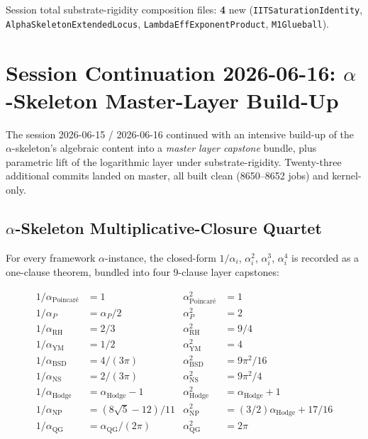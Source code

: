 Session total substrate-rigidity composition files: \textbf{4} new
(\texttt{IITSaturationIdentity}, \texttt{AlphaSkeletonExtendedLocus},
\texttt{LambdaEffExponentProduct}, \texttt{M1Glueball}).

\section{Session Continuation 2026-06-16:
  \texorpdfstring{$\alpha$}{alpha}-Skeleton Master-Layer Build-Up}
\label{sec:session-continuation-2026-06-16}

The session 2026-06-15 / 2026-06-16 continued with an intensive
build-up of the $\alpha$-skeleton's algebraic content into a
\emph{master layer capstone} bundle, plus parametric lift of the
logarithmic layer under substrate-rigidity. Twenty-three additional
commits landed on master, all built clean (8650--8652 jobs) and
kernel-only.

\subsection{\texorpdfstring{$\alpha$}{alpha}-Skeleton Multiplicative-Closure Quartet}

For every framework $\alpha$-instance, the closed-form $1/\alpha_i$,
$\alpha_i^2$, $\alpha_i^3$, $\alpha_i^4$ is recorded as a one-clause
theorem, bundled into four 9-clause layer capstones:

\begin{align*}
1/\alpha_{\text{Poincar\'e}} &= 1
& \alpha_{\text{Poincar\'e}}^2 &= 1 \\
1/\alpha_P &= \alpha_P / 2
& \alpha_P^2 &= 2 \\
1/\alpha_{\text{RH}} &= 2/3
& \alpha_{\text{RH}}^2 &= 9/4 \\
1/\alpha_{\text{YM}} &= 1/2
& \alpha_{\text{YM}}^2 &= 4 \\
1/\alpha_{\text{BSD}} &= 4/(3\pi)
& \alpha_{\text{BSD}}^2 &= 9\pi^2/16 \\
1/\alpha_{\text{NS}} &= 2/(3\pi)
& \alpha_{\text{NS}}^2 &= 9\pi^2/4 \\
1/\alpha_{\text{Hodge}} &= \alpha_{\text{Hodge}} - 1
& \alpha_{\text{Hodge}}^2 &= \alpha_{\text{Hodge}} + 1 \\
1/\alpha_{\text{NP}} &= (8\sqrt{5} - 12)/11
& \alpha_{\text{NP}}^2 &= (3/2)\alpha_{\text{Hodge}} + 17/16 \\
1/\alpha_{\text{QG}} &= \alpha_{\text{QG}}/(2\pi)
& \alpha_{\text{QG}}^2 &= 2\pi
\end{align*}


